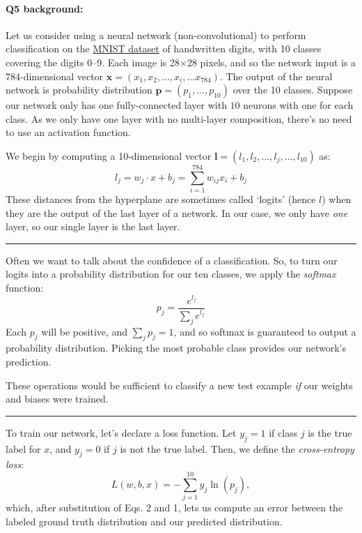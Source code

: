 \pagebreak
\paragraph{Q5 background:} 
Let us consider using a neural network (non-convolutional) to perform classification on the \href{http://yann.lecun.com/exdb/mnist/}{MNIST dataset} of handwritten digits, with 10 classes covering the digits 0--9. Each image is 28$\times$28 pixels, and so the network input is a 784-dimensional vector $\mathbf{x}=(x_1,x_2,...,x_i,...x_{784})$. The output of the neural network is probability distribution $\mathbf{p}=(p_1,...,p_{10})$ over the 10 classes. Suppose our network only has one fully-connected layer with $10$ neurons with one for each class. As we only have one layer with no multi-layer composition, there's no need to use an activation function.

We begin by computing a 10-dimensional vector $\mathbf{l}=(l_1,l_2,...,l_j,...,l_{10})$ as: 
\begin{equation}
    l_j = w_j \cdot x + b_j = \sum_{i=1}^{784}w_{ij}x_i + b_j
\end{equation} 
These distances from the hyperplane are sometimes called `logits' (hence $l$) when they are the output of the last layer of a network. In our case, we only have \emph{one} layer, so our single layer is the last layer.

\hspace{\fill}\rule{0.5\linewidth}{.5pt}\hspace{\fill}

Often we want to talk about the confidence of a classification. So, to turn our logits into a probability distribution for our ten classes, we apply the \emph{softmax} function:
\begin{equation}
    p_j = \frac{e^{l_j}}{\sum_je^{l_j}}
\end{equation}
Each $p_j$ will be positive, and $\sum_jp_j = 1$, and so softmax is guaranteed to output a probability distribution. Picking the most probable class provides our network's prediction.

These operations would be sufficient to classify a new test example \emph{if} our weights and biases were trained.

\hspace{\fill}\rule{0.5\linewidth}{.5pt}\hspace{\fill}

To train our network, let's declare a loss function. Let $y_j=1$ if class $j$ is the true label for $x$, and $y_j = 0$ if $j$ is not the true label. Then, we define the \emph{cross-entropy loss}:
\begin{equation}
    L(w,b,x) = - \sum_{j=1}^{10}y_j\ln(p_j),
\end{equation}
which, after substitution of Eqs. 2 and 1, lets us compute an error between the labeled ground truth distribution and our predicted distribution.

